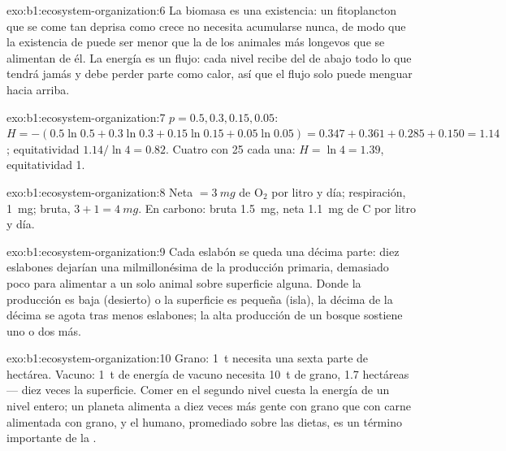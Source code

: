 \begin{solution}{exo:b1:ecosystem-organization:6}
La biomasa es una existencia: un fitoplancton que se come tan deprisa como
crece no necesita acumularse nunca, de modo que la existencia de 
puede ser menor que la de los animales más longevos que se alimentan de él.
La energía es un flujo: cada nivel recibe del de abajo todo lo que tendrá
jamás y debe perder parte como calor, así que el flujo solo puede menguar
hacia arriba.
\end{solution}

\begin{solution}{exo:b1:ecosystem-organization:7}
$p = 0.5, 0.3, 0.15, 0.05$: $H = -(0.5\ln 0.5 + 0.3\ln 0.3 + 0.15\ln
0.15 + 0.05\ln 0.05) = 0.347 + 0.361 + 0.285 + 0.150 = 1.14$;
equitatividad $1.14/\ln 4 = 0.82$. Cuatro con 25 cada una: $H = \ln 4 = 1.39$,
equitatividad 1.
\end{solution}

\begin{solution}{exo:b1:ecosystem-organization:8}
Neta $= \qty{3}{mg}$ de $\mathrm{O_2}$ por litro y día; respiración,
\qty{1}{mg}; bruta, $3 + 1 = \qty{4}{mg}$. En carbono: bruta
\qty{1.5}{mg}, neta \qty{1.1}{mg} de C por litro y día.
\end{solution}

\begin{solution}{exo:b1:ecosystem-organization:9}
Cada eslabón se queda una décima parte: diez eslabones dejarían una
milmillonésima de la producción primaria, demasiado poco para alimentar a un
solo animal sobre superficie alguna. Donde la producción es baja (desierto)
o la superficie es pequeña (isla), la décima de la décima se agota tras
menos eslabones; la alta producción de un bosque sostiene uno o dos más.
\end{solution}

\begin{solution}{exo:b1:ecosystem-organization:10}
Grano: \qty{1}{t} necesita una sexta parte de hectárea. Vacuno: \qty{1}{t}
de energía de vacuno necesita \qty{10}{t} de grano, \num{1.7} hectáreas ---
diez veces la superficie. Comer en el segundo nivel cuesta la energía de un
nivel entero; un planeta alimenta a diez veces más gente con grano que con
carne alimentada con grano, y el  humano, promediado sobre las
dietas, es un término importante de la .
\end{solution}

